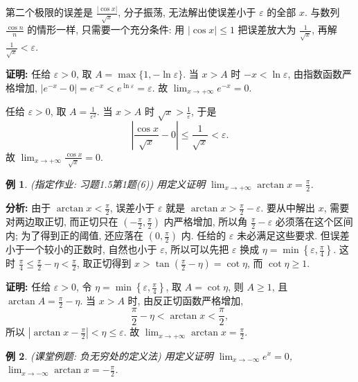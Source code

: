 \documentclass[UTF8,openany]{ctexbook}
\theoremstyle{chinesetextbook}
\newtheorem{example}{例}[section]
\newenvironment{cnproof}{\par\indent\textbf{证明:} \ignorespaces}{\par}
\begin{document}
第二个极限的误差是 $\displaystyle\frac{|\cos x|}{\sqrt x}$, 分子振荡, 无法解出使误差小于 $\varepsilon$ 的全部 $x$. 与数列 $\displaystyle\frac{\cos n}n$ 的情形一样, 只需要一个充分条件: 用 $|\cos x|\le1$ 把误差放大为 $\displaystyle\frac1{\sqrt x}$, 再解 $\displaystyle\frac1{\sqrt x}<\varepsilon$.
\begin{cnproof}
任给 $\varepsilon>0$, 取 $A=\max\{1,-\ln\varepsilon\}$. 当 $x>A$ 时 $-x<\ln\varepsilon$, 由指数函数严格增加, $|e^{-x}-0|=e^{-x}<e^{\ln\varepsilon}=\varepsilon$. 故 $\displaystyle\lim_{x\to+\infty}e^{-x}=0$.

任给 $\varepsilon>0$, 取 $\displaystyle A=\frac1{\varepsilon^2}$. 当 $x>A$ 时 $\displaystyle\sqrt x>\frac1\varepsilon$, 于是
\[
\left|\frac{\cos x}{\sqrt x}-0\right|\le\frac1{\sqrt x}<\varepsilon.
\]
故 $\displaystyle\lim_{x\to+\infty}\frac{\cos x}{\sqrt x}=0$.
\end{cnproof}
\begin{example}
\textnormal{(指定作业: 习题1.5第1题(6))} 用定义证明 $\displaystyle\lim_{x\to+\infty}\arctan x=\frac\pi2$.
\end{example}
\par\indent\textbf{分析:} 由于 $\displaystyle\arctan x<\frac\pi2$, 误差小于 $\varepsilon$ 就是 $\displaystyle\arctan x>\frac\pi2-\varepsilon$. 要从中解出 $x$, 需要对两边取正切, 而正切只在 $\displaystyle\left(-\frac\pi2,\frac\pi2\right)$ 内严格增加, 所以角 $\displaystyle\frac\pi2-\varepsilon$ 必须落在这个区间内; 为了得到正的阈值, 还应落在 $\displaystyle\left(0,\frac\pi2\right)$ 内. 任给的 $\varepsilon$ 未必满足这些要求. 但误差小于一个较小的正数时, 自然也小于 $\varepsilon$, 所以可以先把 $\varepsilon$ 换成 $\displaystyle\eta=\min\left\{\varepsilon,\frac\pi4\right\}$. 这时 $\displaystyle\frac\pi4\le\frac\pi2-\eta<\frac\pi2$, 取正切得到 $\displaystyle x>\tan\left(\frac\pi2-\eta\right)=\cot\eta$, 而 $\cot\eta\ge1$.
\begin{cnproof}
任给 $\varepsilon>0$, 令 $\displaystyle\eta=\min\left\{\varepsilon,\frac\pi4\right\}$, 取 $A=\cot\eta$, 则 $A\ge1$, 且 $\displaystyle\arctan A=\frac\pi2-\eta$. 当 $x>A$ 时, 由反正切函数严格增加,
\[
\frac\pi2-\eta<\arctan x<\frac\pi2,
\]
所以 $\displaystyle\left|\arctan x-\frac\pi2\right|<\eta\le\varepsilon$. 故 $\displaystyle\lim_{x\to+\infty}\arctan x=\frac\pi2$.
\end{cnproof}
\begin{example}
\textnormal{(课堂例题: 负无穷处的定义法)} 用定义证明 $\displaystyle\lim_{x\to-\infty}e^x=0$, $\displaystyle\lim_{x\to-\infty}\arctan x=-\frac\pi2$.
\end{example}
\end{document}
